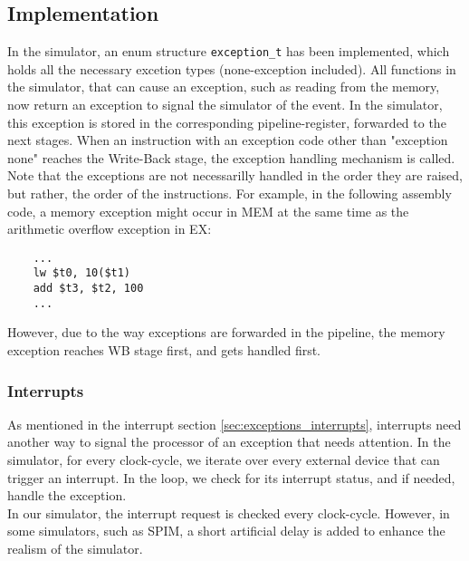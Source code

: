 \subsection{Implementation}
In the simulator, an enum structure \texttt{exception\_t} has been implemented, which
holds all the necessary excetion types (none-exception included).
All functions in the simulator, that can cause an exception, such as reading
from the memory, now return an exception to signal the simulator of the event.
In the simulator, this exception is stored in the corresponding pipeline-register,
forwarded to the next stages. When an instruction with an exception code other
than "exception none" reaches the Write-Back stage, the exception handling
mechanism is called.\\
Note that the exceptions are not necessarilly handled in the order they are
raised, but rather, the order of the instructions. For example, in the following
assembly code, a memory exception might occur in MEM at the same time as the arithmetic
overflow exception in EX:
\begin{lstlisting}
	...
	lw $t0, 10($t1)
	add $t3, $t2, 100
	...
\end{lstlisting}
However, due to the way exceptions are forwarded in the pipeline, the memory
exception reaches WB stage first, and gets handled first.

\subsubsection{Interrupts}
As mentioned in the interrupt section \ref{sec:exceptions_interrupts}, interrupts
need another way to signal the processor of an exception that needs attention.
In the simulator, for every clock-cycle, we iterate over every external device
that can trigger an interrupt.
In the loop, we check for its interrupt status, and if needed, handle the exception.\\
In our simulator, the interrupt request is checked every clock-cycle. However,
in some simulators, such as SPIM, a short artificial delay is added to enhance
the realism of the simulator.


